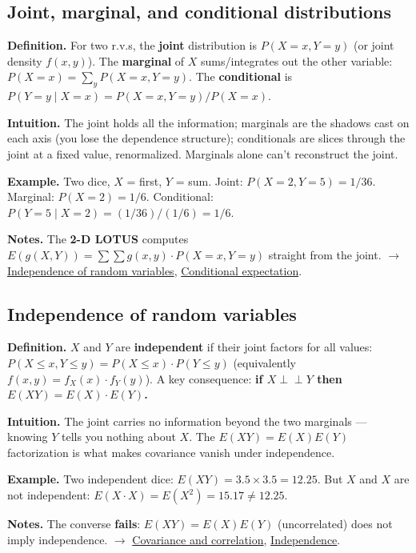 \documentclass[11pt,a4paper]{article}
\begin{document}
\subsection{Joint, marginal, and conditional distributions}\label{sec:joint-marginal-and-conditional-distributions}

\textbf{Definition.} For two r.v.s, the \textbf{joint} distribution is $P(X = x, Y = y)$ (or joint density $f(x,y)$). The \textbf{marginal} of $X$ sums/integrates out the other variable: $P(X = x) = \sum _y P(X = x, Y = y)$. The \textbf{conditional} is $P(Y = y \mid X = x) = P(X = x, Y = y) / P(X = x)$.

\textbf{Intuition.} The joint holds all the information; marginals are the shadows cast on each axis (you lose the dependence structure); conditionals are slices through the joint at a fixed value, renormalized. Marginals alone can't reconstruct the joint.

\textbf{Example.} Two dice, $X$ = first, $Y$ = sum. Joint: $P(X=2, Y=5) = 1/36$. Marginal: $P(X=2) = 1/6$. Conditional: $P(Y=5 \mid X=2) = (1/36)/(1/6) = 1/6$.

\textbf{Notes.} The \textbf{2-D LOTUS} computes $E(g(X,Y)) = \sum \sum  g(x,y)\cdot P(X=x, Y=y)$ straight from the joint. $\to$ \hyperref[sec:independence-of-random-variables]{Independence of random variables}, \hyperref[sec:conditional-expectation]{Conditional expectation}.

\subsection{Independence of random variables}\label{sec:independence-of-random-variables}

\textbf{Definition.} $X$ and $Y$ are \textbf{independent} if their joint factors for all values: $P(X \leq  x, Y \leq  y) = P(X \leq  x)\cdot P(Y \leq  y)$ (equivalently $f(x,y) = f_X(x)\cdot f_Y(y)$). A key consequence: \textbf{if $X \perp\!\!\!\perp  Y$ then $E(XY) = E(X)\cdot E(Y)$.}

\textbf{Intuition.} The joint carries no information beyond the two marginals --- knowing $Y$ tells you nothing about $X$. The $E(XY) = E(X)E(Y)$ factorization is what makes covariance vanish under independence.

\textbf{Example.} Two independent dice: $E(XY) = 3.5 \times  3.5 = 12.25$. But $X$ and $X$ are not independent: $E(X\cdot X) = E(X^{2}) = 15.17 \neq  12.25$.

\textbf{Notes.} The converse \textbf{fails}: $E(XY) = E(X)E(Y)$ (uncorrelated) does not imply independence. $\to$ \hyperref[sec:covariance-and-correlation]{Covariance and correlation}, \hyperref[sec:independence]{Independence}.
\end{document}
